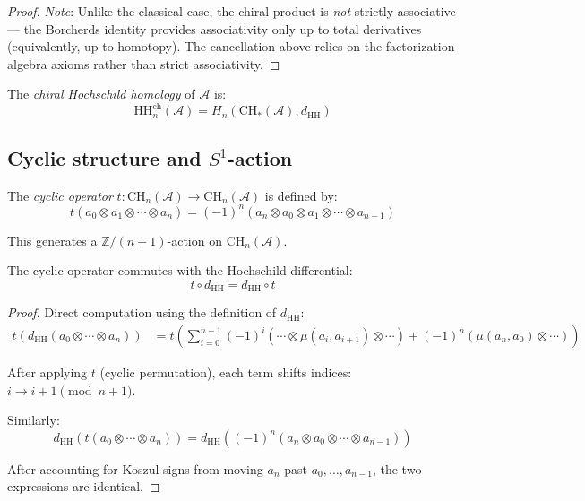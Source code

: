 \begin{proof}
\emph{Note}: Unlike the classical case, the chiral product is \emph{not} strictly associative ---
the Borcherds identity provides associativity only up to total derivatives
(equivalently, up to homotopy). The cancellation above relies on the
factorization algebra axioms rather than strict associativity.
\end{proof}

\begin{definition}
\label{def:chiral-HH}
The \emph{chiral Hochschild homology} of $\mathcal{A}$ is:
\[\text{HH}_n^{\text{ch}}(\mathcal{A}) = H_n(\text{CH}_*(\mathcal{A}), d_{\text{HH}})\]
\end{definition}

\subsection{\texorpdfstring{Cyclic structure and $S^1$-action}{Cyclic structure and S 1-action}}

\begin{definition}
\label{def:cyclic-operator}
The \emph{cyclic operator} $t: \text{CH}_n(\mathcal{A}) \to \text{CH}_n(\mathcal{A})$ 
is defined by:
\[t(a_0 \otimes a_1 \otimes \cdots \otimes a_n) = (-1)^n (a_n \otimes a_0 \otimes a_1 
   \otimes \cdots \otimes a_{n-1})\]

This generates a $\mathbb{Z}/(n+1)$-action on $\text{CH}_n(\mathcal{A})$.
\end{definition}

\begin{lemma}
\label{lem:cyclic-commutes}
The cyclic operator commutes with the Hochschild differential:
\[t \circ d_{\text{HH}} = d_{\text{HH}} \circ t\]
\end{lemma}

\begin{proof}
Direct computation using the definition of $d_{\text{HH}}$:
\begin{align*}
t(d_{\text{HH}}(a_0 \otimes \cdots \otimes a_n))
&= t\left(\sum_{i=0}^{n-1} (-1)^i (\cdots \otimes \mu(a_i,a_{i+1}) \otimes \cdots) 
   + (-1)^n (\mu(a_n,a_0) \otimes \cdots)\right)
\end{align*}

After applying $t$ (cyclic permutation), each term shifts indices: $i \to i+1 \pmod{n+1}$.

Similarly:
\[d_{\text{HH}}(t(a_0 \otimes \cdots \otimes a_n)) = 
   d_{\text{HH}}((-1)^n(a_n \otimes a_0 \otimes \cdots \otimes a_{n-1}))\]

After accounting for Koszul signs from moving $a_n$ past $a_0, \ldots, a_{n-1}$, 
the two expressions are identical.
\end{proof}

